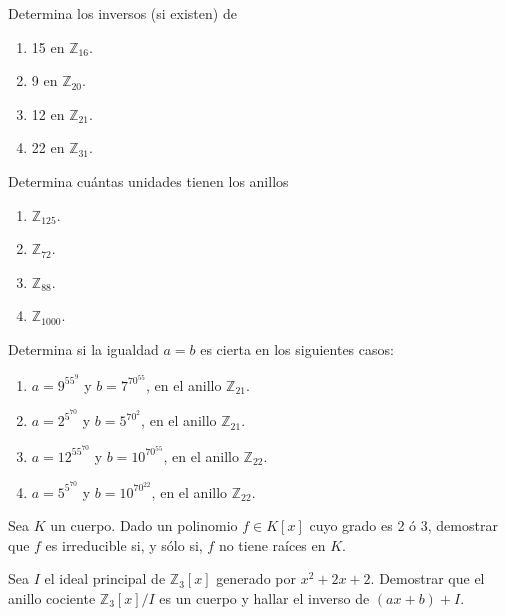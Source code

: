 \begin{ejercicio}
    Determina los inversos (si existen) de
    \begin{enumerate}
        \item 15 en $\mathbb{Z}_{16}$.
        \item 9 en $\mathbb{Z}_{20}$.
        \item 12 en $\mathbb{Z}_{21}$.
        \item 22 en $\mathbb{Z}_{31}$.
    \end{enumerate}
\end{ejercicio}

\begin{ejercicio}
    Determina cuántas unidades tienen los anillos
    \begin{enumerate}
        \item $\mathbb{Z}_{125}$.
        \item $\mathbb{Z}_{72}$.
        \item $\mathbb{Z}_{88}$.
        \item $\mathbb{Z}_{1000}$.
    \end{enumerate}
\end{ejercicio}

\begin{ejercicio}
    Determina si la igualdad $a=b$ es cierta en los siguientes casos:
    \begin{enumerate}
        \item $a=9^{55^{9}}$ y $b=7^{70^{55}}$, en el anillo $\mathbb{Z}_{21}$.
        \item $a=2^{5^{70}}$ y $b=5^{70^{2}}$, en el anillo $\mathbb{Z}_{21}$.
        \item $a=12^{55^{70}}$ y $b=10^{70^{55}}$, en el anillo $\mathbb{Z}_{22}$.
        \item $a=5^{5^{70}}$ y $b=10^{70^{22}}$, en el anillo $\mathbb{Z}_{22}$.
    \end{enumerate}
\end{ejercicio}

\begin{ejercicio}
    Sea $K$ un cuerpo. Dado un polinomio $f\in K[x]$ cuyo grado es 2 ó 3, demostrar que $f$ es irreducible si, y sólo si, $f$ no tiene raíces en $K$.
\end{ejercicio}

\begin{ejercicio}
    Sea $I$ el ideal principal de $\mathbb{Z}_3[x]$ generado por $x^2+2x+2$. Demostrar que el anillo cociente $\mathbb{Z}_3[x]/I$ es un cuerpo y hallar el inverso de $(ax+b)+I$.
\end{ejercicio}

